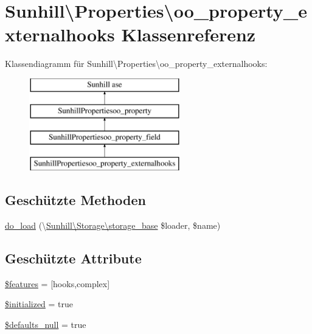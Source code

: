 \hypertarget{classSunhill_1_1Properties_1_1oo__property__externalhooks}{}\section{Sunhill\textbackslash{}Properties\textbackslash{}oo\+\_\+property\+\_\+externalhooks Klassenreferenz}
\label{classSunhill_1_1Properties_1_1oo__property__externalhooks}
Klassendiagramm für Sunhill\textbackslash{}Properties\textbackslash{}oo\+\_\+property\+\_\+externalhooks\+:\begin{figure}[H]
\begin{center}
\leavevmode
\includegraphics[height=4.000000cm]{d2/d4f/classSunhill_1_1Properties_1_1oo__property__externalhooks}
\end{center}
\end{figure}
\subsection*{Geschützte Methoden}
\begin{DoxyCompactItemize}
\item 
\hyperlink{classSunhill_1_1Properties_1_1oo__property__externalhooks_adf5ea86d2cdbd54313833a35b99e9a00}{do\+\_\+load} (\textbackslash{}\hyperlink{classSunhill_1_1Storage_1_1storage__base}{Sunhill\textbackslash{}\+Storage\textbackslash{}storage\+\_\+base} \$loader, \$name)
\end{DoxyCompactItemize}
\subsection*{Geschützte Attribute}
\begin{DoxyCompactItemize}
\item 
\hyperlink{classSunhill_1_1Properties_1_1oo__property__externalhooks_a2c5cbfc0cb59cd9d6dc2a4d652255329}{\$features} = \mbox{[}\textquotesingle{}hooks\textquotesingle{},\textquotesingle{}complex\textquotesingle{}\mbox{]}
\item 
\hyperlink{classSunhill_1_1Properties_1_1oo__property__externalhooks_a641c3da3564fe090c12d61fb12ede574}{\$initialized} = true
\item 
\hyperlink{classSunhill_1_1Properties_1_1oo__property__externalhooks_a9c071ca475f9f7987668e7d7d0bba082}{\$defaults\+\_\+null} = true
\end{DoxyCompactItemize}
